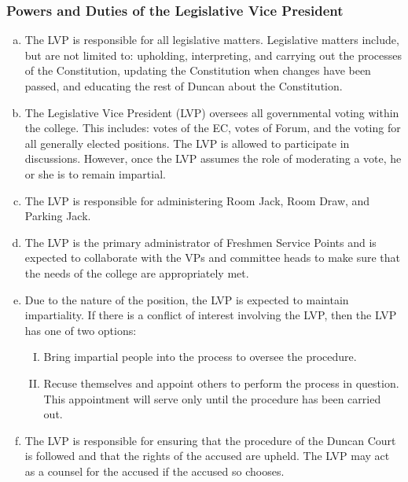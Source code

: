 \documentclass[USletter,12pt]{article}
\begin{document}
\begin{enumerate}[(a)]
\subsubsection{Powers and Duties of the Legislative Vice President}
\begin{enumerate}[(a)]
\item The LVP is responsible for all legislative matters.  Legislative matters include, but are not limited to: upholding, interpreting, and carrying out the processes of the Constitution, updating the Constitution when changes have been passed, and educating the rest of Duncan about the Constitution.
\item The Legislative Vice President (LVP) oversees all governmental voting within the college.  This includes: votes of the EC, votes of Forum, and the voting for all generally elected positions.  The LVP is allowed to participate in discussions.  However, once the LVP assumes the role of moderating a vote, he or she is to remain impartial.
\item The LVP is responsible for administering Room Jack, Room Draw, and Parking Jack.
\item The LVP is the primary administrator of Freshmen Service Points and is expected to collaborate with the VPs and committee heads to make sure that the needs of the college are appropriately met.
\item Due to the nature of the position, the LVP is expected to maintain impartiality.  If there is a conflict of interest involving the LVP, then the LVP has one of two options:
	\begin{enumerate}[(I)]
	\item Bring impartial people into the process to oversee the procedure.
	\item Recuse themselves and appoint others to perform the process in question.  This appointment will serve only until the procedure has been carried out.
	\end{enumerate}
\item The LVP is responsible for ensuring that the procedure of the Duncan Court is followed and that the rights of the accused are upheld.  The LVP may act as a counsel for the accused if the accused so chooses.
\end{enumerate}


\end{enumerate}
\end{document}
